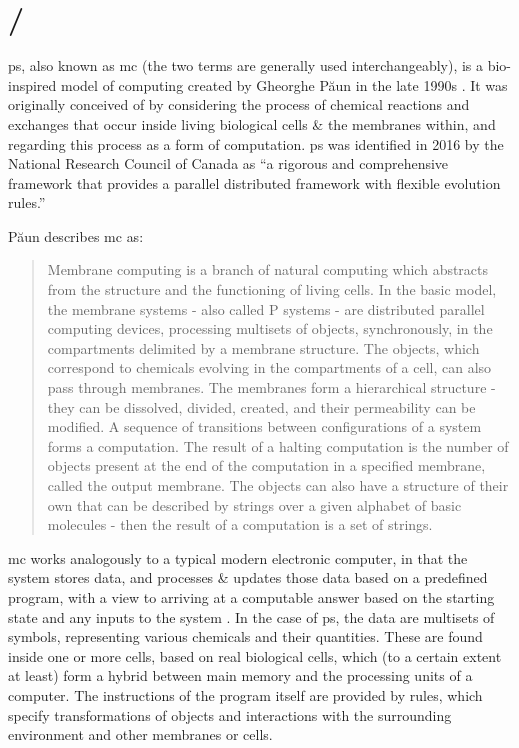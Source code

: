 \section{/}
\Gls{ps}, also known as \Gls{mc} (the two terms are generally used interchangeably), is a bio-inspired model of computing created by Gheorghe Păun in the late 1990s \cite{tPaun98a,Paun2000}.  It was originally conceived of by considering the process of chemical reactions and exchanges that occur inside living biological cells \& the membranes within, and regarding this process as a form of computation.  \Gls{ps} was identified in 2016 by the National Research Council of Canada as ``a rigorous and comprehensive framework that provides a parallel distributed framework with flexible evolution rules.'' \cite[p. 17]{Wiseman2016}

Păun describes \gls{mc} \cite[p.~VII]{Paun2002} as:
\begin{quote}
Membrane computing is a branch of natural computing which abstracts from
the structure and the functioning of living cells. In the basic model, the membrane
systems - also called P systems - are distributed parallel computing
devices, processing multisets of objects, synchronously, in the compartments
delimited by a membrane structure. The objects, which correspond to chemicals
evolving in the compartments of a cell, can also pass through membranes.
The membranes form a hierarchical structure - they can be dissolved, divided,
created, and their permeability can be modified. A sequence of transitions between
configurations of a system forms a computation. The result of a halting
computation is the number of objects present at the end of the computation
in a specified membrane, called the output membrane. The objects can also
have a structure of their own that can be described by strings over a given
alphabet of basic molecules - then the result of a computation is a set of
strings.
\end{quote}

\Gls{mc} works analogously to a typical modern electronic computer, in that the system stores data, and processes \& updates those data based on a predefined program, with a view to arriving at a computable answer based on the starting state and any inputs to the system \cite{Paun2002,Paun2010b}.  In the case of \gls{ps}, the data are multisets of symbols, representing various chemicals and their quantities.  These are found inside one or more cells, based on real biological cells, which (to a certain extent at least) form a hybrid between main memory and the processing units of a computer.  The instructions of the program itself are provided by rules, which specify transformations of objects and interactions with the surrounding environment and other membranes or cells.

